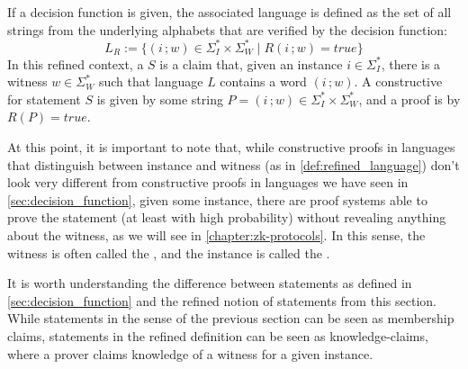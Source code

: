 If a decision function is given, the associated language is defined as the set of all strings from the underlying alphabets that are verified by the decision function:
\begin{equation}
\label{def:refined_language}
L_R := \{(i\,;w)\in \Sigma_I^* \times \Sigma_W^* \;|\; R(i\,;w)=true\}
\end{equation}
In this refined context, a  $S$ is a claim that, given an instance $i\in\Sigma_I^*$, there is a witness $w\in \Sigma_W^*$ such that language $L$ contains a word $(i\,;w)$. A constructive  for statement $S$ is given by some string $P=(i\,; w) \in \Sigma_I^* \times \Sigma_W^*$, and a proof is  by $R(P)=true$. 

At this point, it is important to note that, while constructive proofs in languages that distinguish between instance and witness (as in  \ref{def:refined_language}) don't look very different from constructive proofs in languages we have seen in \secname{} \ref{sec:decision_function}, given some instance, there are proof systems able to prove the statement (at least with high probability) without revealing anything about the witness, as we will see in \chaptname{} \ref{chapter:zk-protocols}. In this sense, the witness is often called the , and the instance is called the .

It is worth understanding the difference between statements as defined in \secname{} \ref{sec:decision_function} and the refined notion of statements from this section. While statements in the sense of the previous section can be seen as membership claims, statements in the refined definition can be seen as knowledge-claims, where a prover claims knowledge of a witness for a given instance. 

